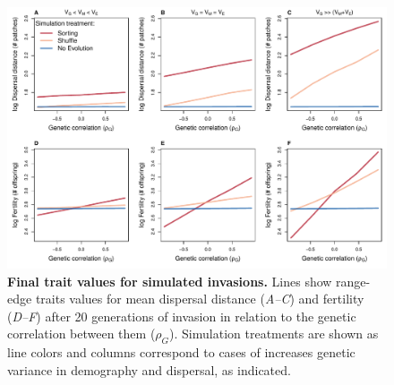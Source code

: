 \documentclass[11pt]{article}
\begin{document}
\newpage{}
\begin{figure}[h!]
\centering
\includegraphics[width=1\linewidth]{Figures/app_fig_traits}
\caption{\textbf{Final trait values for simulated invasions.} Lines show range-edge traits values for mean dispersal distance (\textit{A--C}) and fertility (\textit{D--F}) after 20 generations of invasion in relation to the genetic correlation between them ($\rho_{G}$). Simulation treatments are shown as line colors and columns correspond to cases of increases genetic variance in demography and dispersal, as indicated.}
\label{corr:app_fig_traits}
\end{figure}

\newpage{}




\end{document}
